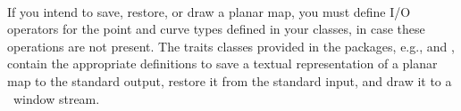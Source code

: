\\


If you intend to save, restore, or draw a planar map, you must
define I/O operators for the point and curve types defined in your
 classes, in case these operations are not present. The
traits classes provided in the  packages, e.g.,
 and ,
contain the appropriate definitions to save a textual representation
of a planar map to the standard output, restore it from the standard 
input, and draw it to a \cgal\ window stream.


